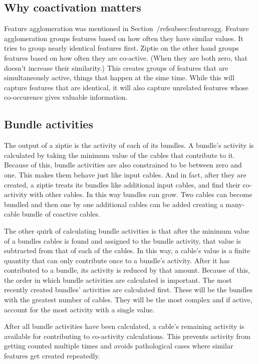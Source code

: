 \subsection{Why coactivation matters}
\label{subsec:whycoactivation}

Feature agglomeration was mentioned in Section~/ref{subsec:featureagg}.
Feature agglomeration groups features based on how often
they have similar values. It tries to group nearly identical
features first. Ziptie on the other hand groups features based on how
often they are co-active. (When they are both zero, that doesn't
increase their similarity.) This creates groups of features that
are simultaneously active, things that
happen at the sime time. While this will capture features that are identical,
it will also capture unrelated features whose co-occurence gives
valuable information.


\subsection{Bundle activities}
\label{subsec:algobundle}

The output of a ziptie is the activity of each of its bundles.
A bundle's activity is calculated by taking the minimum value of the cables
that contribute to it. Because of this, bundle activities are also constrained
to be between zero and one. This makes them behave just like input cables.
And in fact, after they are created, a ziptie treats its bundles like additional
input cables, and find their co-activity with other cables.
In this way bundles can grow. Two cables can become bundled and then one by one
additional cables can be added creating a many-cable bundle of coactive cables.

The other quirk of calculating bundle activities is that after
the minimum value of a bundles cables is found and assigned
to the bundle activity, that value is subtracted from that
of each of the cables. In this way, a cable's value is a finite
quantity that can only contribute once to a bundle's activity.
After it has contributed to a bundle, its activity is reduced by that amount.
Because of this, the order in which bundle activities are calculated
is important. The most recently created bundles' activities are calculated first.
These will be the bundles with the greatest number of cables.
They will be the most complex and if active, account for the most activity with a single value.

After all bundle activities have been calculated, a cable’s remaining
activity is available for contributing to co-activity calculations.
This prevents activity from getting counted multiple times
and avoids pathological cases where similar features get created repeatedly.

